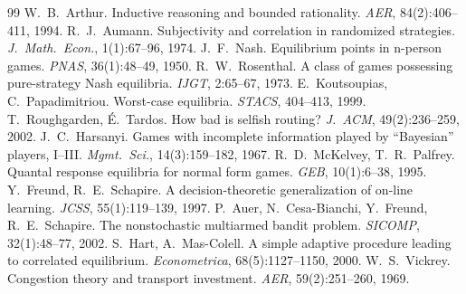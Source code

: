 \documentclass{article}
\begin{document}
\begin{thebibliography}{99}\small\setlength{\itemsep}{0pt}
 W.~B.~Arthur. Inductive reasoning and bounded rationality. \emph{AER}, 84(2):406--411, 1994.
 R.~J.~Aumann. Subjectivity and correlation in randomized strategies. \emph{J.\ Math.\ Econ.}, 1(1):67--96, 1974.
 J.~F.~Nash. Equilibrium points in n-person games. \emph{PNAS}, 36(1):48--49, 1950.
 R.~W.~Rosenthal. A class of games possessing pure-strategy Nash equilibria. \emph{IJGT}, 2:65--67, 1973.
 E.~Koutsoupias, C.~Papadimitriou. Worst-case equilibria. \emph{STACS}, 404--413, 1999.
 T.~Roughgarden, \'E.~Tardos. How bad is selfish routing? \emph{J.\ ACM}, 49(2):236--259, 2002.
 J.~C.~Harsanyi. Games with incomplete information played by ``Bayesian'' players, I--III. \emph{Mgmt.\ Sci.}, 14(3):159--182, 1967.
 R.~D.~McKelvey, T.~R.~Palfrey. Quantal response equilibria for normal form games. \emph{GEB}, 10(1):6--38, 1995.
 Y.~Freund, R.~E.~Schapire. A decision-theoretic generalization of on-line learning. \emph{JCSS}, 55(1):119--139, 1997.
 P.~Auer, N.~Cesa-Bianchi, Y.~Freund, R.~E.~Schapire. The nonstochastic multiarmed bandit problem. \emph{SICOMP}, 32(1):48--77, 2002.
 S.~Hart, A.~Mas-Colell. A simple adaptive procedure leading to correlated equilibrium. \emph{Econometrica}, 68(5):1127--1150, 2000.
 W.~S.~Vickrey. Congestion theory and transport investment. \emph{AER}, 59(2):251--260, 1969.
\end{thebibliography}
\end{document}
